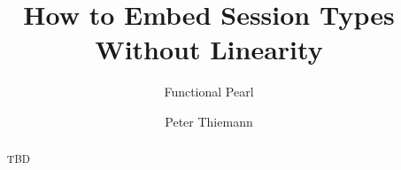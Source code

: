 \documentclass[acmsmall,screen,anonymous,review]{acmart}
\begin{document}
\title{How to Embed Session Types Without Linearity}
\subtitle{Functional Pearl}

\author{Peter Thiemann}


\begin{abstract}
  TBD
\end{abstract}

\end{document}
